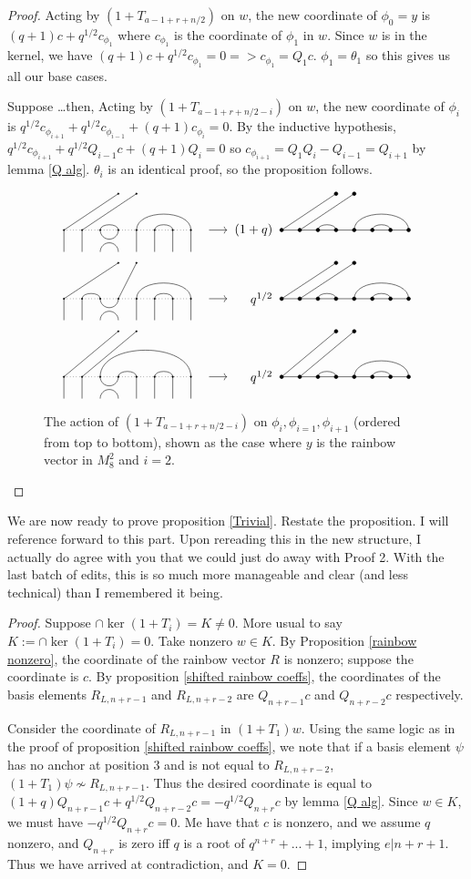 \documentclass{amsart}
\begin{document}
\begin{proof}
	Acting by $(1+T_{a-1+r+n/2})$ on $w$, the new coordinate of $\phi_0=y$ is $(q+1)c+q^{1/2}c_{\phi_1}$ where $c_{\phi_1}$ is the coordinate of $\phi_1$ in $w$. Since $w$ is in the kernel, we have $(q+1)c+q^{1/2}c_{\phi_1}=0=>c_{\phi_1}=Q_1c$. $\phi_1=\theta_1$ so this gives us all our base cases.

  {\color{magenta} Suppose \ldots then,}
	Acting by $(1+T_{a-1+r+n/2-i})$ on $w$, the new coordinate of $\phi_i$ is $q^{1/2}c_{\phi_{i+1}}+q^{1/2}c_{\phi_{i-1}}+(q+1)c_{\phi_{i}}=0$. By the inductive hypothesis, $q^{1/2}c_{\phi_{i+1}}+q^{1/2}Q_{i-1}c+(q+1)Q_i=0$ so $c_{\phi_{i+1}}=Q_1Q_i-Q_{i-1}=Q_{i+1}$ by lemma \ref{Q alg}. $\theta_i$ is an identical proof, so the proposition follows. 
	
	
	\begin{figure}
		\[
		\GeneralizedAction{8}{3/4,5/8,6/7}{2}{1/1,2/2}{1}{3}{3/4,5/8,6/7}{1/1,2/2}{(1+q)}
		\]
		\[
		\GeneralizedAction{8}{2/3,5/8,6/7}{2}{1/1,4/2}{1}{3}{3/4,5/8,6/7}{1/1,2/2}{q^{1/2}}
		\]
		\[
		\GeneralizedAction{8}{3/8,4/5,6/7}{2}{1/1,2/2}{1.25}{3}{3/4,5/8,6/7}{1/1,2/2}{q^{1/2}}
		\]
		\caption{The action of $(1+T_{a-1+r+n/2-i})$ on $\phi_i,\phi_{i=1},\phi_{i+1}$ (ordered from top to bottom), shown as the case where $y$ is the rainbow vector in $M_{8}^2$ and $i=2$.}
		\label{shifted relations}
	\end{figure}
\end{proof}	

We are now ready to prove proposition \ref{Trivial}.
{\color{magenta} Restate the proposition. I will reference forward to this part.
  Upon rereading this in the new structure, I actually do agree with you that we could just do away with Proof 2.
  With the last batch of edits, this is so much more manageable and clear (and less technical) than I remembered it being.
}

\begin{proof}
	Suppose $\cap\ker(1+T_i)=K\not=0$.
  {\color{magenta} More usual to say $K := \cap \ker(1 + T_i) = 0$.}
  Take nonzero $w\in K$. By Proposition \ref{rainbow nonzero}, the coordinate of the rainbow vector $R$ is nonzero; suppose the coordinate is $c$. By proposition \ref{shifted rainbow coeffs}, the coordinates of the basis elements $R_{L,n+r-1}$ and $R_{L,n+r-2}$ are $Q_{n+r-1}c$ and $Q_{n+r-2}c$ respectively.
	
	Consider the coordinate of $R_{L,n+r-1}$ in $(1+T_1)w$. Using the same logic as in the proof of proposition \ref{shifted rainbow coeffs}, we note that if a basis element $\psi$ has no anchor at position $3$ and is not equal to $R_{L,n+r-2}$, $(1+T_1)\psi\not\sim R_{L,n+r-1}$. Thus the desired coordinate is equal to $(1+q)Q_{n+r-1}c+q^{1/2}Q_{n+r-2}c=-q^{1/2}Q_{n+r}c$ by lemma \ref{Q alg}. Since $w\in K$, we must have $-q^{1/2}Q_{n+r}c=0$. Me have that $c$ is nonzero, and we assume $q$ nonzero, and $Q_{n+r}$ is zero iff $q$ is a root of $q^{n+r}+...+1$, implying $e|n+r+1$. Thus we have arrived at contradiction, and $K=0$.
\end{proof}
\end{document}
